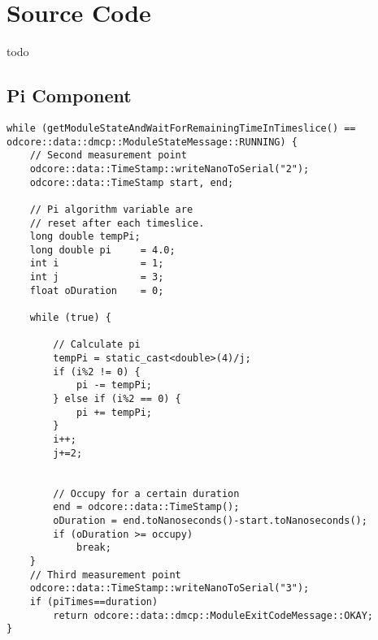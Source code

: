 \chapter{Source Code}

todo 

\section{Pi Component}


\begin{lstlisting}[frame=single,label={code:pi}]
while (getModuleStateAndWaitForRemainingTimeInTimeslice() == odcore::data::dmcp::ModuleStateMessage::RUNNING) {
	// Second measurement point
    odcore::data::TimeStamp::writeNanoToSerial("2");
    odcore::data::TimeStamp start, end;

    // Pi algorithm variable are
    // reset after each timeslice.
    long double tempPi;
    long double pi     = 4.0;
    int i              = 1;
    int j              = 3;
    float oDuration    = 0;

    while (true) {

        // Calculate pi
        tempPi = static_cast<double>(4)/j;
        if (i%2 != 0) {
            pi -= tempPi;
        } else if (i%2 == 0) {
            pi += tempPi;
        }
        i++;
        j+=2;


        // Occupy for a certain duration
        end = odcore::data::TimeStamp();
        oDuration = end.toNanoseconds()-start.toNanoseconds();
        if (oDuration >= occupy)
            break;
    }
    // Third measurement point
    odcore::data::TimeStamp::writeNanoToSerial("3");
    if (piTimes==duration)
        return odcore::data::dmcp::ModuleExitCodeMessage::OKAY;
}
\end{lstlisting}



